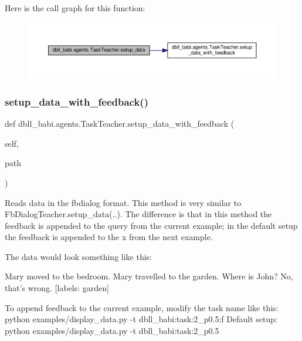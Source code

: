 Here is the call graph for this function\+:
\nopagebreak
\begin{figure}[H]
\begin{center}
\leavevmode
\includegraphics[width=350pt]{classdbll__babi_1_1agents_1_1TaskTeacher_adcbc1c54716e7b631e4a496f59df1f33_cgraph}
\end{center}
\end{figure}
\mbox{\label{classdbll__babi_1_1agents_1_1TaskTeacher_a3275c0a4a11a3f5e723259d487db03f8}} 
\subsubsection{\texorpdfstring{setup\+\_\+data\+\_\+with\+\_\+feedback()}{setup\_data\_with\_feedback()}}
{\footnotesize\ttfamily def dbll\+\_\+babi.\+agents.\+Task\+Teacher.\+setup\+\_\+data\+\_\+with\+\_\+feedback (\begin{DoxyParamCaption}\item[{}]{self,  }\item[{}]{path }\end{DoxyParamCaption})}

\begin{DoxyVerb}Reads data in the fbdialog format.
This method is very similar to FbDialogTeacher.setup_data(..).
The difference is that in this method the feedback is appended to the query
from the current example; in the default setup the feedback is appended to
the x from the next example.

The data would look something like this:

Mary moved to the bedroom.
Mary travelled to the garden.
Where is John?
No, that's wrong.
[labels: garden]

To append feedback to the current example, modify the task name like this:
  python examples/display_data.py -t dbll_babi:task:2_p0.5:f
Default setup:
  python examples/display_data.py -t dbll_babi:task:2_p0.5\end{DoxyVerb}
 

